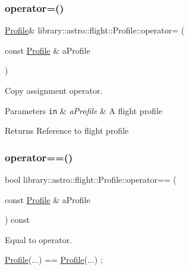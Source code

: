 \subsubsection{\texorpdfstring{operator=()}{operator=()}}
{\footnotesize\ttfamily \hyperlink{classlibrary_1_1astro_1_1flight_1_1_profile}{Profile}\& library\+::astro\+::flight\+::\+Profile\+::operator= (\begin{DoxyParamCaption}\item[{const \hyperlink{classlibrary_1_1astro_1_1flight_1_1_profile}{Profile} \&}]{a\+Profile }\end{DoxyParamCaption})\hspace{0.3cm}{\ttfamily [default]}}



Copy assignment operator. 


\begin{DoxyParams}[1]{Parameters}
\mbox{\tt in}  & {\em a\+Profile} & A flight profile \\
\hline
\end{DoxyParams}
\begin{DoxyReturn}{Returns}
Reference to flight profile 
\end{DoxyReturn}
\mbox{\label{classlibrary_1_1astro_1_1flight_1_1_profile_a02ca3f2ff4cf5b5cb093b15c4ed8fb33}} 
\subsubsection{\texorpdfstring{operator==()}{operator==()}}
{\footnotesize\ttfamily bool library\+::astro\+::flight\+::\+Profile\+::operator== (\begin{DoxyParamCaption}\item[{const \hyperlink{classlibrary_1_1astro_1_1flight_1_1_profile}{Profile} \&}]{a\+Profile }\end{DoxyParamCaption}) const}



Equal to operator. 


\begin{DoxyCode}
\hyperlink{classlibrary_1_1astro_1_1flight_1_1_profile_a34d66fdddf3eda9a3fed036d6b9a4363}{Profile}(...) == \hyperlink{classlibrary_1_1astro_1_1flight_1_1_profile_a34d66fdddf3eda9a3fed036d6b9a4363}{Profile}(...) ;
\end{DoxyCode}



